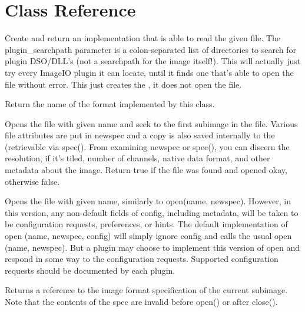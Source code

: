 \section{\ImageInput Class Reference}
\label{sec:imageinput:reference}

Create and return an \ImageInput implementation that is able
to read the given file.  The {\kw plugin_searchpath} parameter is a
colon-separated list of directories to search for \product plugin
DSO/DLL's (not a searchpath for the image itself!).  This will
actually just try every ImageIO plugin it can locate, until it
finds one that's able to open the file without error.  This just
creates the \ImageInput, it does not open the file.
\apiend

Return the name of the format implemented by this class.
\apiend

Opens the file with given name and seek to the first subimage in the
file.  Various file attributes are put in
{\kw newspec} and a copy is also saved internally to the
\ImageInput (retrievable via {\kw spec()}.  From examining
{\kw newspec} or {\kw spec()}, you can discern the resolution, if it's
tiled, number of channels, native data format, and other metadata about
the image.  Return {\kw true} if the file was found and opened okay,
otherwise {\kw false}.
\apiend


Opens the file with given name, similarly to {\cf open(name, newspec)}.
However, in this version, any non-default fields of {\cf config},
including metadata, will be taken to be configuration requests,
preferences, or hints.  The default implementation of 
{\cf open (name, newspec, config)} will simply ignore {\cf config} and
calls the usual {\cf open (name, newspec)}.  But a plugin may choose to
implement this version of {\cf open} and respond in some way to the
configuration requests.  Supported configuration requests should be
documented by each plugin.
\apiend

Returns a reference to the image format specification of the
current subimage.  Note that the contents of the spec are
invalid before {\kw open()} or after {\kw close()}.
\apiend

